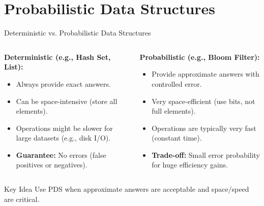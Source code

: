 \section{Probabilistic Data Structures}
\begin{frame}{Deterministic vs. Probabilistic Data Structures}
  \begin{columns}
    \begin{column}{0.5\textwidth}
      \textbf{Deterministic (e.g., Hash Set, List):}
      \begin{itemize}
        \item Always provide exact answers.
        \item Can be space-intensive (store all elements).
        \item Operations might be slower for large datasets (e.g., disk I/O).
        \item \textbf{Guarantee:} No errors (false positives or negatives).
      \end{itemize}
    \end{column}
    \begin{column}{0.5\textwidth}
      \textbf{Probabilistic (e.g., Bloom Filter):}
      \begin{itemize}
        \item Provide approximate answers with controlled error.
        \item Very space-efficient (use bits, not full elements).
        \item Operations are typically very fast (constant time).
        \item \textbf{Trade-off:} Small error probability for huge efficiency gains.
      \end{itemize}
    \end{column}
  \end{columns}

  \begin{block}{Key Idea}
    Use PDS when approximate answers are acceptable and space/speed are critical.
  \end{block}
\end{frame}

